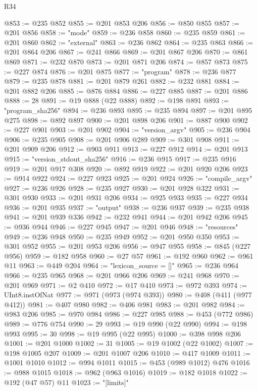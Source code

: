 \begin{lexlean}{R34}
\begin{coremodule}
@853 := @235 @852
@855 := @201 @853 @206
@856 := @850 @855
@857 := @201 @856
@858 := "mode"
@859 := @236 @858
@860 := @235 @859
@861 := @201 @860
@862 := "external"
@863 := @236 @862
@864 := @235 @863
@866 := @201 @864 @206
@867 := @241 @866
@869 := @201 @867 @206
@870 := @861 @869
@871 := @232 @870
@873 := @201 @871 @206
@874 := @857 @873
@875 := @227 @874
@876 := @201 @875
@877 := "program"
@878 := @236 @877
@879 := @235 @878
@881 := @201 @879 @261
@882 := @232 @881
@884 := @201 @882 @206
@885 := @876 @884
@886 := @227 @885
@887 := @201 @886
@888 := 28
@891 := @19 @888 (@22 @888)
@892 := @198 @891
@893 := "program_sha256"
@894 := @236 @893
@895 := @235 @894
@897 := @201 @895 @275
@898 := @892 @897
@900 := @201 @898 @206
@901 := @887 @900
@902 := @227 @901
@903 := @201 @902
@904 := "version_argv"
@905 := @236 @904
@906 := @235 @905
@908 := @201 @906 @289
@909 := @301 @908
@911 := @201 @909 @206
@912 := @903 @911
@913 := @227 @912
@914 := @201 @913
@915 := "version_stdout_sha256"
@916 := @236 @915
@917 := @235 @916
@919 := @201 @917 @308
@920 := @892 @919
@922 := @201 @920 @206
@923 := @914 @922
@924 := @227 @923
@925 := @201 @924
@926 := "compile_argv"
@927 := @236 @926
@928 := @235 @927
@930 := @201 @928 @322
@931 := @301 @930
@933 := @201 @931 @206
@934 := @925 @933
@935 := @227 @934
@936 := @201 @935
@937 := "output"
@938 := @236 @937
@939 := @235 @938
@941 := @201 @939 @336
@942 := @232 @941
@944 := @201 @942 @206
@945 := @936 @944
@946 := @227 @945
@947 := @201 @946
@948 := "resources"
@949 := @236 @948
@950 := @235 @949
@952 := @201 @950 @350
@953 := @301 @952
@955 := @201 @953 @206
@956 := @947 @955
@958 := @845 (@227 @956)
@959 := @182 @958
@960 := @27 @57
@961 := @192 @960
@962 := @961 @11
@963 := @449 @204
@964 := "lexicon_source = []"
@965 := @236 @964
@966 := @235 @965
@968 := @201 @966 @206
@969 := @241 @968
@970 := @201 @969
@971 := @2 @410
@972 := @17 @410
@973 := @972 @393
@974 := UInt8.instOfNat
@977 := @971 (@973 (@974 @393))
@980 := @408 (@411 (@977 @412))
@981 := @407 @980
@982 := @406 @981
@983 := @201 @982
@984 := @983 @206
@985 := @970 @984
@986 := @227 @985
@988 := @453 (@772 @986)
@989 := @776 @754
@990 := 29
@993 := @19 @990 (@22 @990)
@994 := @198 @993
@995 := 30
@998 := @19 @995 (@22 @995)
@1000 := @398 @998 @206
@1001 := @201 @1000
@1002 := 31
@1005 := @19 @1002 (@22 @1002)
@1007 := @198 @1005 @207
@1009 := @201 @1007 @206
@1010 := @417 @1009
@1011 := @1001 @1010
@1012 := @994 @1011
@1015 := @453 (@989 @1012) @476
@1016 := @988 @1015
@1018 := @962 (@963 @1016)
@1019 := @182 @1018
@1022 := @192 (@47 @57) @11
@1023 := "[limits]"

\end{coremodule}
\end{lexlean}
